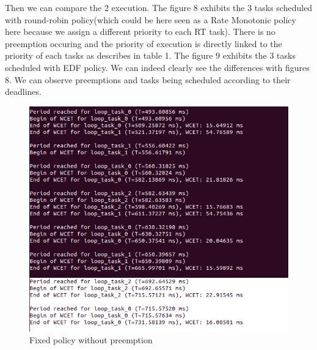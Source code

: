 \documentclass[12pt,hidelinks]{article}
\begin{document}
{        Then we can compare the 2 execution. The figure 8 exhibits the 3 tasks scheduled with round-robin policy(which could be here seen as a Rate Monotonic policy here because we assign a different priority to each RT task). There is no preemption occuring and the priority of execution is directly linked to the priority of each tasks as describes in table 1.\newline
        The figure 9 exhibits the 3 tasks scheduled with EDF policy. We can indeed clearly see the differences with figures 8. We can observe preemptions and tasks being scheduled according to their deadlines.
        
        \begin{figure}[ht]
            \centering
            \begin{minipage}{0.45\textwidth}
                \hspace{-2.5cm}
                \includegraphics[width=1.4\textwidth]{FixedWithoutPreemption.png} %
                \caption{Fixed policy without preemption}
            \end{minipage}\hfill
            \begin{minipage}{0.45\textwidth}
                \hspace{-1cm}

\end{minipage}
\end{figure}}
\end{document}
